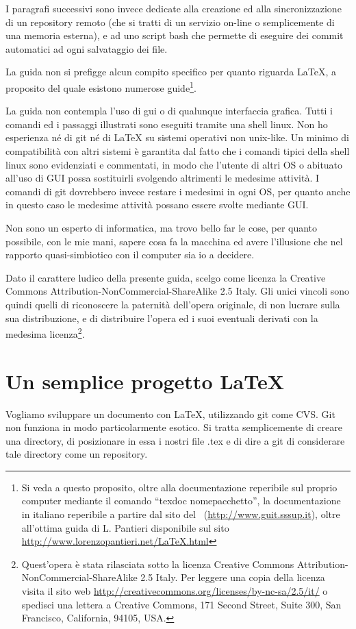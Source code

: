 \documentclass[a4paper,12pt,oneside]{article}
\begin{document}
I paragrafi successivi sono invece dedicate alla creazione ed alla
sincronizzazione di un repository remoto (che si tratti di un servizio on-line
o semplicemente di una memoria esterna), e ad uno script bash che permette di
eseguire dei commit automatici ad ogni salvataggio dei file.

La guida non si prefigge alcun compito specifico per quanto riguarda \LaTeX, a
proposito del quale esistono numerose guide\footnote{Si veda a questo proposito,
oltre alla documentazione reperibile sul proprio computer mediante il comando
``texdoc nomepacchetto'', la documentazione in italiano reperibile a partire dal
sito del \guit\ (\url{http://www.guit.sssup.it}), oltre all'ottima guida di L. Pantieri
disponibile sul sito \url{http://www.lorenzopantieri.net/LaTeX.html}}.

La guida non contempla l'uso di gui o di qualunque interfaccia grafica. Tutti i
comandi ed i passaggi illustrati sono eseguiti tramite una shell linux.
Non ho esperienza né di git né di \LaTeX{} su sistemi operativi non
unix-like. Un minimo di compatibilità con altri sistemi è garantita dal fatto
che i comandi tipici della shell linux sono evidenziati e commentati, in modo
che l'utente di altri OS o abituato all'uso di GUI possa sostituirli svolgendo
altrimenti le medesime attività. I comandi di git dovrebbero invece restare i
medesimi in ogni OS, per quanto anche in questo caso le medesime attività
possano essere svolte mediante GUI.

Non sono un esperto di informatica, ma trovo bello far le cose, per quanto
possibile, con le mie mani, sapere cosa fa la macchina ed avere l'illusione che
nel rapporto quasi-simbiotico con il computer sia io a decidere.

Dato il carattere ludico della presente guida, scelgo come licenza la Creative
Commons Attribution-NonCommercial-ShareAlike 2.5 Italy. Gli unici vincoli sono
quindi quelli di riconoscere la paternità dell'opera
originale, di non lucrare sulla sua distribuzione, e di distribuire l'opera ed
i suoi eventuali derivati con la medesima licenza\footnote{
Quest'opera è stata rilasciata sotto la licenza
Creative Commons Attribution-NonCommercial-ShareAlike 2.5 Italy.
Per leggere una copia della licenza visita il sito web
\url{http://creativecommons.org/licenses/by-nc-sa/2.5/it/}
o spedisci una lettera a Creative Commons, 171 Second Street, Suite 300, San
Francisco, California, 94105, USA.}.

\section{Un semplice progetto \LaTeX}
Vogliamo sviluppare un documento con \LaTeX, utilizzando git come CVS.
Git non funziona in modo particolarmente esotico. Si tratta semplicemente di
creare una directory, di posizionare in essa i nostri file .tex e di dire a git
di considerare tale directory come un repository.
\end{document}
